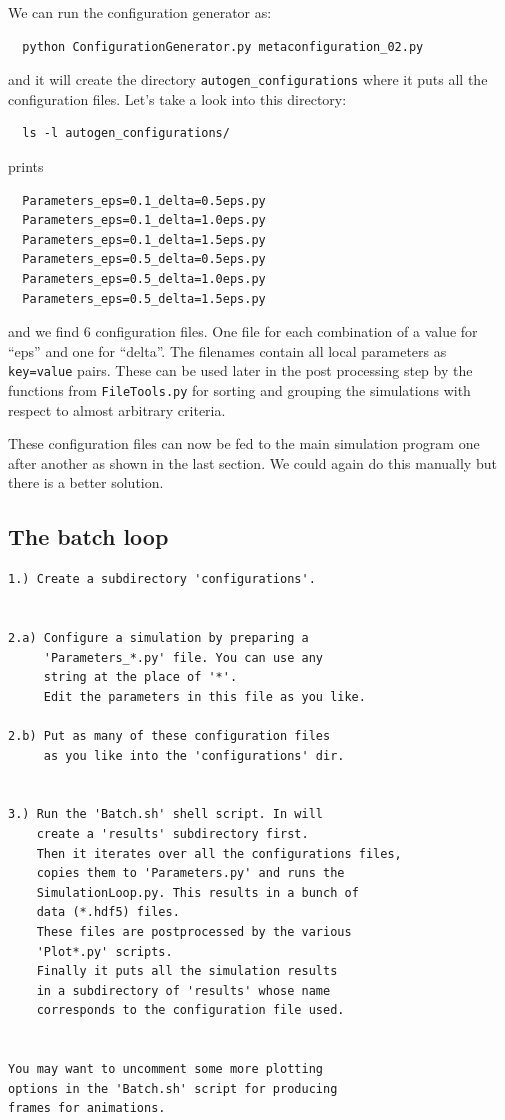 \documentclass[a4paper,10pt]{report}
\begin{document}
We can run the configuration generator as:

\begin{verbatim}
  python ConfigurationGenerator.py metaconfiguration_02.py
\end{verbatim}

and it will create the directory \texttt{autogen\_configurations} where it puts
all the configuration files. Let's take a look into this directory:

\begin{verbatim}
  ls -l autogen_configurations/
\end{verbatim}

prints

\begin{verbatim}
  Parameters_eps=0.1_delta=0.5eps.py
  Parameters_eps=0.1_delta=1.0eps.py
  Parameters_eps=0.1_delta=1.5eps.py
  Parameters_eps=0.5_delta=0.5eps.py
  Parameters_eps=0.5_delta=1.0eps.py
  Parameters_eps=0.5_delta=1.5eps.py
\end{verbatim}

and we find 6 configuration files. One file for each combination of a value for
``eps'' and one for ``delta''. The filenames contain all local parameters as \texttt{key=value}
pairs. These can be used later in the post processing step by the functions from
\texttt{FileTools.py} for sorting and grouping the simulations with respect to
almost arbitrary criteria.

These configuration files can now be fed to the main simulation program one after
another as shown in the last section. We could again do this manually but there is
a better solution.

\subsection{The batch loop}

\begin{verbatim}
1.) Create a subdirectory 'configurations'.


2.a) Configure a simulation by preparing a
     'Parameters_*.py' file. You can use any
     string at the place of '*'.
     Edit the parameters in this file as you like.

2.b) Put as many of these configuration files
     as you like into the 'configurations' dir.


3.) Run the 'Batch.sh' shell script. In will
    create a 'results' subdirectory first.
    Then it iterates over all the configurations files,
    copies them to 'Parameters.py' and runs the
    SimulationLoop.py. This results in a bunch of
    data (*.hdf5) files.
    These files are postprocessed by the various
    'Plot*.py' scripts.
    Finally it puts all the simulation results
    in a subdirectory of 'results' whose name
    corresponds to the configuration file used.


You may want to uncomment some more plotting
options in the 'Batch.sh' script for producing
frames for animations.
\end{verbatim}
\end{document}
